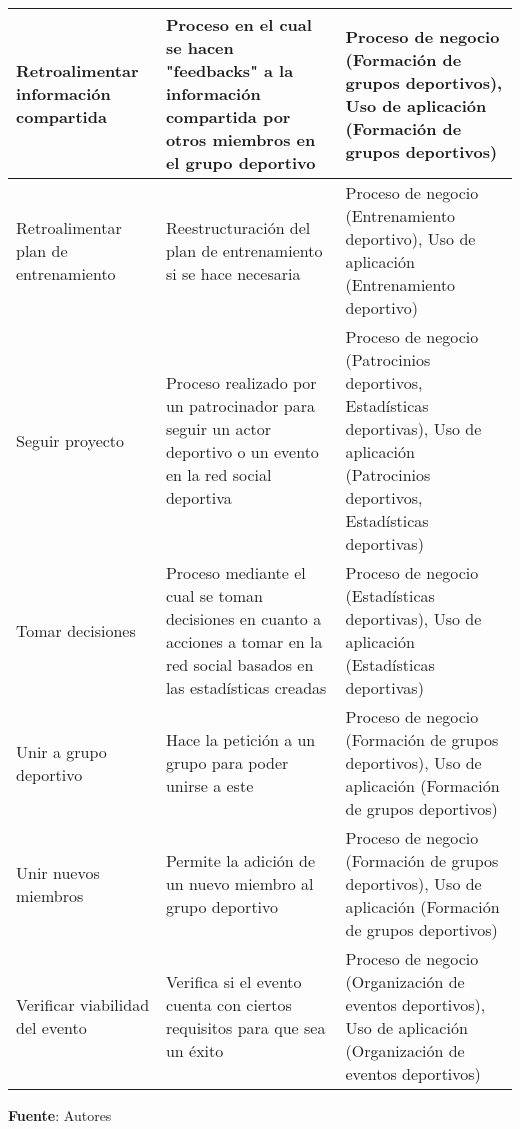 \begin{center}
\begin{longtable}{|p{4cm}|p{7cm}|p{4cm}|}
		\hline
		Retroalimentar información compartida & 
		Proceso en el cual se hacen "feedbacks" a la información compartida por otros miembros en el grupo deportivo & 
		Proceso de negocio (Formación de grupos deportivos), Uso de aplicación (Formación de grupos deportivos)
		\\
		\hline
		Retroalimentar plan de entrenamiento & 
		Reestructuración del plan de entrenamiento si se hace necesaria & 
		Proceso de negocio (Entrenamiento deportivo), Uso de aplicación (Entrenamiento deportivo)
		\\
		\hline
		Seguir proyecto & 
		Proceso realizado por un patrocinador para seguir un actor deportivo o un evento en la red social deportiva & 
		Proceso de negocio (Patrocinios deportivos, Estadísticas deportivas), Uso de aplicación (Patrocinios deportivos, Estadísticas deportivas)
		\\
		\hline
		Tomar decisiones & 
		Proceso mediante el cual se toman decisiones en cuanto a acciones a tomar en la red social basados en las estadísticas creadas &
		Proceso de negocio (Estadísticas deportivas), Uso de aplicación (Estadísticas deportivas)
		\\
		\hline
		Unir a grupo deportivo & 
		Hace la petición a un grupo para poder unirse a este & 
		Proceso de negocio (Formación de grupos deportivos), Uso de aplicación (Formación de grupos deportivos)
		\\
		\hline
		Unir nuevos miembros & 
		Permite la adición de un nuevo miembro al grupo deportivo & 
		Proceso de negocio (Formación de grupos deportivos), Uso de aplicación (Formación de grupos deportivos)
		\\
		\hline
		Verificar viabilidad del evento & 
		Verifica si el evento cuenta con ciertos requisitos para que sea un éxito & 
		Proceso de negocio (Organización de eventos deportivos), Uso de aplicación (Organización de eventos deportivos)
		\\
		\hline
	\end{longtable}
	\textbf{Fuente}: Autores
\end{center}